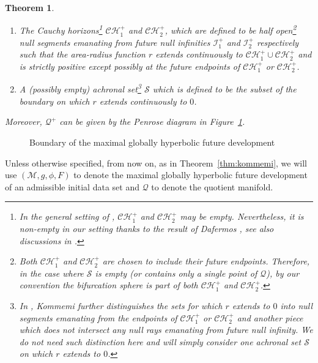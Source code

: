 \documentclass[10pt, reqno]{amsart}
\newtheorem{theorem}{Theorem}[section]
\theoremstyle{definition}
\theoremstyle{remark}
\theoremstyle{conjecture}
\numberwithin{equation}{section}
\newcommand{\0}{\emptyset}
\newcommand{\calC}{\mathcal C}
\newcommand{\calH}{\mathcal H}
\newcommand{\calM}{\mathcal M}
\newcommand{\calQ}{\mathcal Q}
\newcommand{\CH}{\calC \calH^{+}}		%
\begin{document}
\begin{theorem}
\begin{enumerate}
\begin{enumerate}
\item The Cauchy horizons\footnote{In the general setting of \cite{Kommemi}, $\CH_1$ and $\CH_2$ may be empty. Nevertheless, it is non-empty in our setting thanks to the result of Dafermos \cite{D2}, see also discussions in \cite{LO.interior}.} $\CH_1$ and $\CH_2$, which are defined to be half open\footnote{Both $\CH_1$ and $\CH_2$ are chosen to include their future endpoints. Therefore, in the case where $\mathcal S$ is empty (or contains only a single point of $\mathcal Q$), by our convention the bifurcation sphere is part of both $\CH_1$ and $\CH_2$.} null segments emanating from future null infinities $\mathcal I^+_1$ and $\mathcal I^+_2$ respectively such that the area-radius function $r$ extends continuously to $\CH_1\cup \CH_2$ and is strictly positive except possibly at the future endpoints of $\CH_1$ or $\CH_2$.
\item A (possibly empty) achronal set\footnote{In \cite{Kommemi}, Kommemi further distinguishes the sets for which $r$ extends to $0$ into null segments emanating from the endpoints of $\CH_1$ or $\CH_2$ and another piece which does not intersect any null rays emanating from future null infinity. We do not need such distinction here and will simply consider one achronal set $\mathcal S$ on which $r$ extends to $0$.} $\mathcal S$ which is defined to be the subset of the boundary on which $r$ extends continuously to $0$.
\end{enumerate}
Moreover, $\mathcal Q^+$ can be given by the Penrose diagram in Figure~\ref{fig:Kommemi}.
\end{enumerate}
\end{theorem}

\begin{figure}[h]
\begin{center}
\def\svgwidth{300px}
 
\caption{Boundary of the maximal globally hyperbolic future development} \label{fig:Kommemi}
\end{center}
\end{figure}

Unless otherwise specified, from now on, as in Theorem~\ref{thm:kommemi}, we will use $(\calM, g, \phi, F)$ to denote the maximal globally hyperbolic future development of an admissible initial data set and $\calQ$ to denote the quotient manifold.
\end{document}

